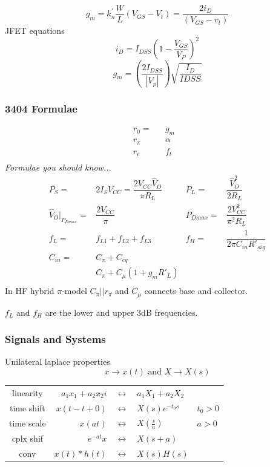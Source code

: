 \[g_m = k_n^\prime \frac{W}{L} (V_{GS} - V_t) = \frac{2i_D}{(V_{GS} - v_t)}\]
JFET equations
\[i_D = I_{DSS} \left(1 - \frac{V_{GS}}{V_P}\right)^2\]
\[g_m = \left(\frac{2I_{DSS}}{|V_p|}\right)\sqrt{\frac{I_D}{I{DSS}}}\]


\subsubsection*{3404 Formulae}
\[ \begin{array}{cccc}
r_0=  &     &g_m    &\\
r_\pi &     &\alpha &\\
r_e   &     &f_t    &\\
\end{array} \]
\emph{Formulae you should know...}
\[ \begin{array}{rlrl}
P_S=&2I_SV_{CC}=\dfrac{2V_{CC}\hat{V}_O}{\pi R_L}&
P_L=&\dfrac{\hat{V}^2_O}{2 R_L}\\
\hat{V}_O|_{P_{Dmax}}=&\dfrac{2 V_{CC}}{\pi}
&P_{Dmax}=&\dfrac{2V^2_{CC}}{\pi^2R_L}\\
f_L=&f_{L1}+f_{L2}+f_{L3}&f_H=&\dfrac{1}{2\pi C_{in}R'_{sig}}\\
C_{in}= &C_\pi+C_{eq}&&\\
        &C_\pi+C_\mu(1+g_mR'_L)&&\\
\end{array}\]
In HF hybrid $\pi$-model $C_\pi||r_\pi$ and $C_\mu$ connects base and collector.

$f_L$ and $f_H$ are the lower and upper 3dB frequencies.
\columnbreak
\subsubsection*{Signals and Systems}
Unilateral laplace properties \[x \rightarrow x(t) \mbox{ and } X \rightarrow X(s)\]

\begin{tabular}{crcll}
linearity& $a_1x_1 + a_2x_2i$&$\leftrightarrow $&$a_1X_1+a_2X_2$&\\
time shift& $x(t-t+0) $&$\leftrightarrow $&$X(s)e^{-t_0s}$ & $t_0 > 0$\\
time scale&$x(at)$&$ \leftrightarrow $&$X\left( \frac{s}{a} \right)$ & $a>0$\\
cplx shif& $e^{-at}x $&$\leftrightarrow $&$X(s+a)$&\\
conv& $x(t)*h(t) $&$\leftrightarrow $&$X(s)H(s)$&\\
\end{tabular}

